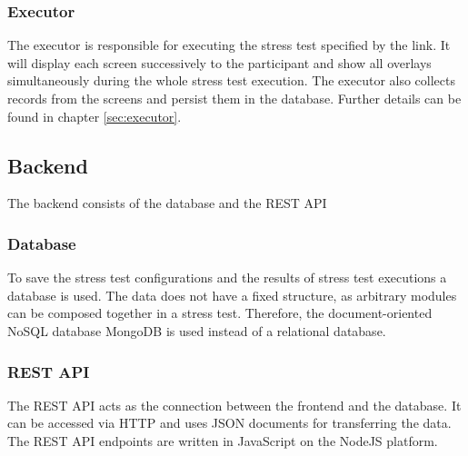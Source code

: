 \subsubsection*{Executor}
The executor is responsible for executing the stress test specified by the link.
It will display each screen successively to the participant and show all overlays simultaneously during the whole stress test execution.
The executor also collects records from the screens and persist them in the database.
Further details can be found in chapter \ref{sec:executor}.

\subsection{Backend}
The backend consists of the database and the REST API

\subsubsection*{Database}
To save the stress test configurations and the results of stress test executions a database is used.
The data does not have a fixed structure, as arbitrary modules can be composed together in a stress test.
Therefore, the document-oriented NoSQL database MongoDB is used instead of a relational database.

\subsubsection*{REST API}
The REST API acts as the connection between the frontend and the database.
It can be accessed via HTTP and uses JSON documents for transferring the data.
The REST API endpoints are written in JavaScript on the NodeJS platform.
